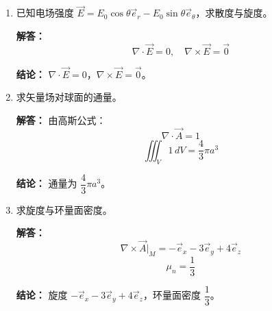\begin{enumerate}[label=\arabic*.]
\textbf{结论：}
散度 $\boxed{5}$，旋度 $\boxed{\vec{e}_y}$。

\vspace{1em}
\item 已知电场强度 $\vec{E} = E_0\cos\theta\vec{e}_r - E_0\sin\theta\vec{e}_\theta$，求散度与旋度。

\textbf{解答：}
\[
\nabla\cdot\vec{E} = 0,\quad \nabla\times\vec{E} = \vec{0}
\]

\textbf{结论：}
$\boxed{\nabla\cdot\vec{E} = 0}$，$\boxed{\nabla\times\vec{E} = \vec{0}}$。

\vspace{1em}
\item 求矢量场对球面的通量。

\textbf{解答：}
由高斯公式：
\[
\nabla\cdot\vec{A} = 1
\]
\[
\iiint_V 1\,dV = \frac{4}{3}\pi a^3
\]

\textbf{结论：}
通量为 $\boxed{\dfrac{4}{3}\pi a^3}$。

\vspace{1em}
\item 求旋度与环量面密度。

\textbf{解答：}
\[
\nabla\times\vec{A}\big|_M = -\vec{e}_x - 3\vec{e}_y + 4\vec{e}_z
\]
\[
\mu_n = \frac{1}{3}
\]

\textbf{结论：}
旋度 $\boxed{-\vec{e}_x - 3\vec{e}_y + 4\vec{e}_z}$，环量面密度 $\boxed{\dfrac{1}{3}}$。

\end{enumerate}